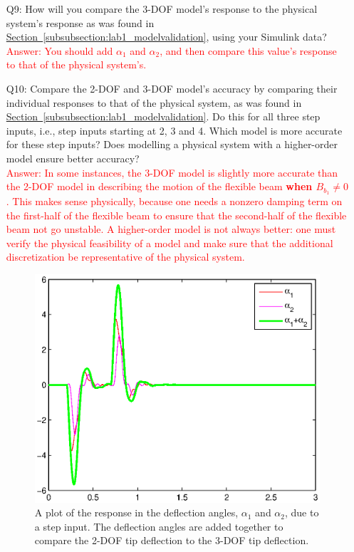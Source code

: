 \documentclass[12pt]{report}
\newcommand\drew[1]{\textcolor{red}{#1}}
\begin{document}
\begin{enumerate}[Question]
    \item[Q9:]How will you compare the 3-DOF model's response to the physical system's response as was found in \hyperref[subsubsection:lab1_modelvalidation]{Section~\ref{subsubsection:lab1_modelvalidation}}, using your Simulink data?\\
          \drew{Answer: You should add $\alpha_1$ and $\alpha_2$, and then compare this value's response to that of the physical system's.}
    \item[Q10:] Compare the 2-DOF and 3-DOF model's accuracy by comparing their individual responses to that of the physical system, as was found in \hyperref[subsubsection:lab1_modelvalidation]{Section~\ref{subsubsection:lab1_modelvalidation}}. Do this for all three step inputs, i.e., step inputs starting at 2, 3 and 4. Which model is more accurate for these step inputs? Does modelling a physical system with a higher-order model ensure better accuracy?\\
          \drew{Answer: In some instances, the 3-DOF model is slightly more accurate than the 2-DOF model in describing the motion of the flexible beam \textbf{when $B_{b_1} \not = 0$}. This makes sense physically, because one needs a nonzero damping term on the first-half of the flexible beam to ensure that the second-half of the flexible beam not go unstable. A higher-order model is not always better: one must verify the physical feasibility of a model and make sure that the additional discretization be representative of the physical system.}
          \begin{figure}[htb!]
              \centering
              \includegraphics[width=.5\linewidth]{eps/lab_1/3DOF_response.eps}
              \caption{A plot of the response in the deflection angles, $\alpha_1$ and $\alpha_2$, due to a step input. The deflection angles are added together to compare the 2-DOF tip deflection to the 3-DOF tip deflection.}
              \label{fig:lab1_3DOF_response}
          \end{figure}

\end{enumerate}
\end{document}

